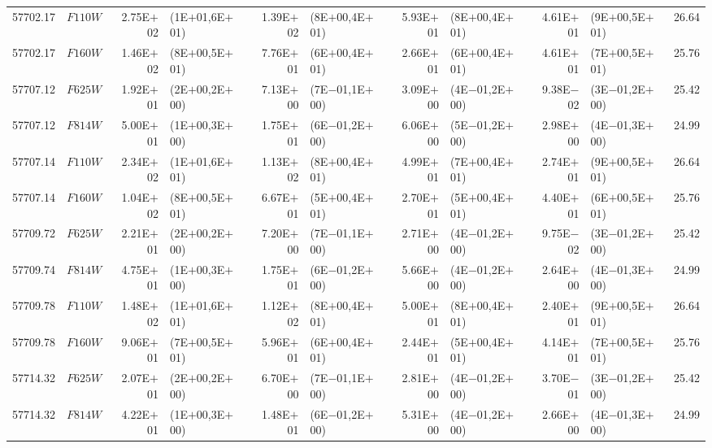 \begin{tabular}{r c r @{\hspace{0.5em}} l r @{\hspace{0.5em}} l r @{\hspace{0.5em}} l r @{\hspace{0.5em}} l r}
57702.17 & $F110W$ & 2.75E$+$02 & (1E$+$01,6E$+$01) & 1.39E$+$02 & (8E$+$00,4E$+$01) & 5.93E$+$01 & (8E$+$00,4E$+$01) & 4.61E$+$01 & (9E$+$00,5E$+$01) & 26.64\\
57702.17 & $F160W$ & 1.46E$+$02 & (8E$+$00,5E$+$01) & 7.76E$+$01 & (6E$+$00,4E$+$01) & 2.66E$+$01 & (6E$+$00,4E$+$01) & 4.61E$+$01 & (7E$+$00,5E$+$01) & 25.76\\
57707.12 & $F625W$ & 1.92E$+$01 & (2E$+$00,2E$+$00) & 7.13E$+$00 & (7E$-$01,1E$+$00) & 3.09E$+$00 & (4E$-$01,2E$+$00) & 9.38E$-$02 & (3E$-$01,2E$+$00) & 25.42\\
57707.12 & $F814W$ & 5.00E$+$01 & (1E$+$00,3E$+$00) & 1.75E$+$01 & (6E$-$01,2E$+$00) & 6.06E$+$00 & (5E$-$01,2E$+$00) & 2.98E$+$00 & (4E$-$01,3E$+$00) & 24.99\\
57707.14 & $F110W$ & 2.34E$+$02 & (1E$+$01,6E$+$01) & 1.13E$+$02 & (8E$+$00,4E$+$01) & 4.99E$+$01 & (7E$+$00,4E$+$01) & 2.74E$+$01 & (9E$+$00,5E$+$01) & 26.64\\
57707.14 & $F160W$ & 1.04E$+$02 & (8E$+$00,5E$+$01) & 6.67E$+$01 & (5E$+$00,4E$+$01) & 2.70E$+$01 & (5E$+$00,4E$+$01) & 4.40E$+$01 & (6E$+$00,5E$+$01) & 25.76\\
57709.72 & $F625W$ & 2.21E$+$01 & (2E$+$00,2E$+$00) & 7.20E$+$00 & (7E$-$01,1E$+$00) & 2.71E$+$00 & (4E$-$01,2E$+$00) & 9.75E$-$02 & (3E$-$01,2E$+$00) & 25.42\\
57709.74 & $F814W$ & 4.75E$+$01 & (1E$+$00,3E$+$00) & 1.75E$+$01 & (6E$-$01,2E$+$00) & 5.66E$+$00 & (4E$-$01,2E$+$00) & 2.64E$+$00 & (4E$-$01,3E$+$00) & 24.99\\
57709.78 & $F110W$ & 1.48E$+$02 & (1E$+$01,6E$+$01) & 1.12E$+$02 & (8E$+$00,4E$+$01) & 5.00E$+$01 & (8E$+$00,4E$+$01) & 2.40E$+$01 & (9E$+$00,5E$+$01) & 26.64\\
57709.78 & $F160W$ & 9.06E$+$01 & (7E$+$00,5E$+$01) & 5.96E$+$01 & (6E$+$00,4E$+$01) & 2.44E$+$01 & (5E$+$00,4E$+$01) & 4.14E$+$01 & (7E$+$00,5E$+$01) & 25.76\\
57714.32 & $F625W$ & 2.07E$+$01 & (2E$+$00,2E$+$00) & 6.70E$+$00 & (7E$-$01,1E$+$00) & 2.81E$+$00 & (4E$-$01,2E$+$00) & 3.70E$-$01 & (3E$-$01,2E$+$00) & 25.42\\
57714.32 & $F814W$ & 4.22E$+$01 & (1E$+$00,3E$+$00) & 1.48E$+$01 & (6E$-$01,2E$+$00) & 5.31E$+$00 & (4E$-$01,2E$+$00) & 2.66E$+$00 & (4E$-$01,3E$+$00) & 24.99\\
\hline\hline
\end{tabular}
